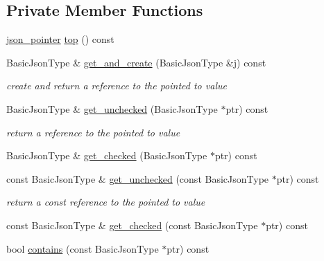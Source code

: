 \subsection*{Private Member Functions}
\begin{DoxyCompactItemize}
\item 
\hyperlink{classnlohmann_1_1json__pointer}{json\+\_\+pointer} \hyperlink{classnlohmann_1_1json__pointer_a00eff109d9a0091e42ada9b16b90c8d9}{top} () const
\item 
Basic\+Json\+Type \& \hyperlink{classnlohmann_1_1json__pointer_a583c726016f440ffe65553935c101ff5}{get\+\_\+and\+\_\+create} (Basic\+Json\+Type \&j) const
\begin{DoxyCompactList}\small\item\em create and return a reference to the pointed to value \end{DoxyCompactList}\item 
Basic\+Json\+Type \& \hyperlink{classnlohmann_1_1json__pointer_a577512ee6b7f030e8872b4d29fa5c3e5}{get\+\_\+unchecked} (Basic\+Json\+Type $\ast$ptr) const
\begin{DoxyCompactList}\small\item\em return a reference to the pointed to value \end{DoxyCompactList}\item 
Basic\+Json\+Type \& \hyperlink{classnlohmann_1_1json__pointer_a366d68a67e40d86676d3bdb52e167294}{get\+\_\+checked} (Basic\+Json\+Type $\ast$ptr) const
\item 
const Basic\+Json\+Type \& \hyperlink{classnlohmann_1_1json__pointer_ad6a01f8e1556eef68e5a49b33fef1548}{get\+\_\+unchecked} (const Basic\+Json\+Type $\ast$ptr) const
\begin{DoxyCompactList}\small\item\em return a const reference to the pointed to value \end{DoxyCompactList}\item 
const Basic\+Json\+Type \& \hyperlink{classnlohmann_1_1json__pointer_a55a5bbbc3007e479607304a3e8cb9bf5}{get\+\_\+checked} (const Basic\+Json\+Type $\ast$ptr) const
\item 
bool \hyperlink{classnlohmann_1_1json__pointer_a90d38e45e2d3add52d824bc55da8f772}{contains} (const Basic\+Json\+Type $\ast$ptr) const
\end{DoxyCompactItemize}

